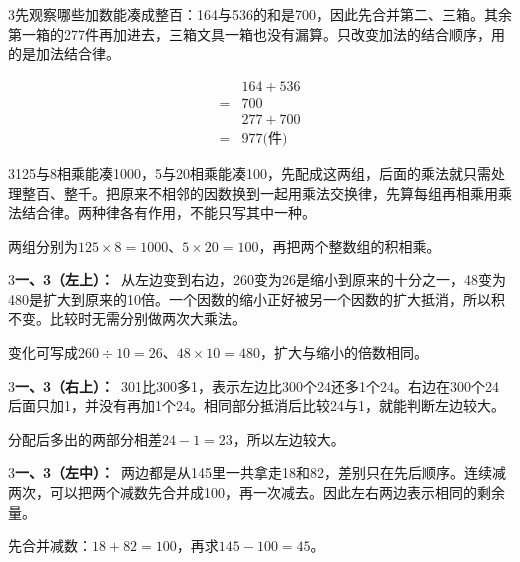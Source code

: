\documentclass[multi=snippet,border={5bp 20bp 5bp 5bp}]{standalone}
\newenvironment{snippet}[3]{\begin{minipage}{#1bp}\color{answerred}\fontsize{#2}{#3}\selectfont\raggedright}{\end{minipage}}
\begin{document}
\begin{snippet}{505}{11.5}{14}\begin{multicols}{3}\raggedcolumns 先观察哪些加数能凑成整百：164与536的和是700，因此先合并第二、三箱。其余第一箱的277件再加进去，三箱文具一箱也没有漏算。只改变加法的结合顺序，用的是加法结合律。\par \[\begin{aligned}&164+536\\={}&700\\&277+700\\={}&977\text{(件)}\end{aligned}\]\end{multicols}\end{snippet}
\begin{snippet}{505}{11.5}{14}\begin{multicols}{3}\raggedcolumns 125与8相乘能凑1000，5与20相乘能凑100，先配成这两组，后面的乘法就只需处理整百、整千。把原来不相邻的因数换到一起用乘法交换律，先算每组再相乘用乘法结合律。两种律各有作用，不能只写其中一种。\par 两组分别为\(125\times8=1000\)\allowbreak 、\(5\times20=100\)\allowbreak ，再把两个整数组的积相乘。\end{multicols}\end{snippet}
\begin{snippet}{505}{11.5}{14}\begin{multicols}{3}\raggedcolumns \textbf{一、3（左上）：}\ 从左边变到右边，260变为26是缩小到原来的十分之一，48变为480是扩大到原来的10倍。一个因数的缩小正好被另一个因数的扩大抵消，所以积不变。比较时无需分别做两次大乘法。\par 变化可写成\(260\div10=26\)\allowbreak 、\(48\times10=480\)\allowbreak ，扩大与缩小的倍数相同。\end{multicols}\end{snippet}
\begin{snippet}{505}{11.5}{14}\begin{multicols}{3}\raggedcolumns \textbf{一、3（右上）：}\ 301比300多1，表示左边比300个24还多1个24。右边在300个24后面只加1，并没有再加1个24。相同部分抵消后比较24与1，就能判断左边较大。\par 分配后多出的两部分相差\(24-1=23\)\allowbreak ，所以左边较大。\end{multicols}\end{snippet}
\begin{snippet}{505}{11.5}{14}\begin{multicols}{3}\raggedcolumns \textbf{一、3（左中）：}\ 两边都是从145里一共拿走18和82，差别只在先后顺序。连续减两次，可以把两个减数先合并成100，再一次减去。因此左右两边表示相同的剩余量。\par 先合并减数：\(18+82=100\)\allowbreak ，再求\(145-100=45\)\allowbreak 。\end{multicols}\end{snippet}
\end{document}
